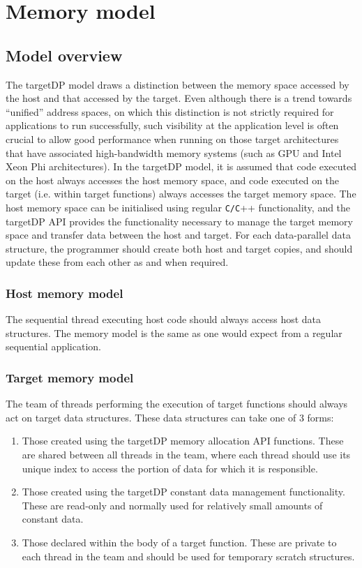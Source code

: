 \chapter{Memory model}\label{sec:memmodel}

\section{Model overview}
The targetDP model draws a distinction between the memory space
accessed by the host and that accessed by the target. Even although
there is a trend towards ``unified'' address spaces, on which this
distinction is not strictly required for applications to run successfully, such
visibility at the application level is often crucial to allow good
performance when running on those target architectures that have
associated high-bandwidth memory systems (such as GPU and Intel Xeon
Phi architectures). In the targetDP model, it is assumed that code
executed on the host always accesses the host memory space, and code
executed on the target (i.e. within target functions) always accesses
the target memory space. The host memory space can be initialised
using regular \verb+C/C+++ functionality, and the targetDP API
provides the functionality necessary to manage the target memory space
and transfer data between the host and target. For each data-parallel
data structure, the programmer should create both host and target
copies, and should update these from each other as and when required.

\subsection{Host memory model}
The sequential thread executing host code should always access host data
structures. The memory model is the same as one would expect from a
regular sequential application.

\subsection{Target memory model}
The team of threads performing the execution of target functions
should always act on target data structures. These data structures can
take one of 3 forms:
\begin{enumerate}
\item Those created using the targetDP memory allocation API
  functions. These are shared between all threads in the team, where
  each thread should use its unique index to access the portion of data
  for which it is responsible.
\item Those created using the targetDP constant data management
  functionality. These are read-only and normally used for relatively
  small amounts of constant data.
\item Those declared within the body of a target function. These are private
  to each thread in the team and should be used for temporary scratch structures.
\end{enumerate}

